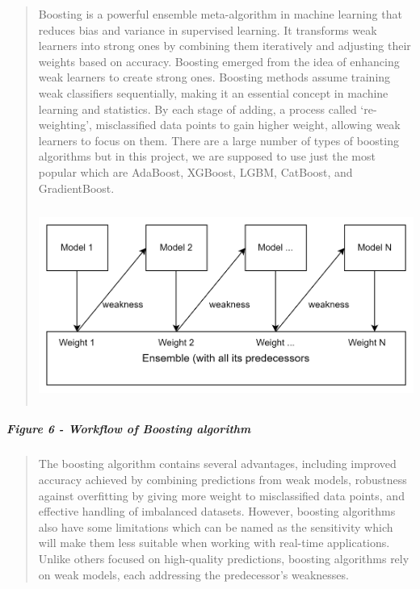 \documentclass[
]{article}
\begin{document}
\begin{quote}
Boosting is a powerful ensemble meta-algorithm in machine learning that
reduces bias and variance in supervised learning. It transforms weak
learners into strong ones by combining them iteratively and adjusting
their weights based on accuracy. Boosting emerged from the idea of
enhancing weak learners to create strong ones. Boosting methods assume
training weak classifiers sequentially, making it an essential concept
in machine learning and statistics. By each stage of adding, a process
called `re-weighting', misclassified data points to gain higher weight,
allowing weak learners to focus on them. There are a large number of
types of boosting algorithms but in this project, we are supposed to use
just the most popular which are AdaBoost, XGBoost, LGBM, CatBoost, and
GradientBoost.

\includegraphics[width=5.34971in,height=2.51151in]{vertopal_f239f640fefe43bb8bc0698cafd57825/media/image7.png}
\end{quote}

\hypertarget{figure-6---workflow-of-boosting-algorithm}{%
\subparagraph{\texorpdfstring{\textbf{Figure 6} - Workflow of Boosting
algorithm}{Figure 6 - Workflow of Boosting algorithm}}\label{figure-6---workflow-of-boosting-algorithm}}

\begin{quote}
The boosting algorithm contains several advantages, including improved
accuracy achieved by combining predictions from weak models, robustness
against overfitting by giving more weight to misclassified data points,
and effective handling of imbalanced datasets. However, boosting
algorithms also have some limitations which can be named as the
sensitivity which will make them less suitable when working with
real-time applications. Unlike others focused on high-quality
predictions, boosting algorithms rely on weak models, each addressing
the predecessor's weaknesses.
\end{quote}
\end{document}

